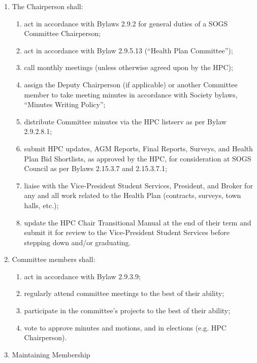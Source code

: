 \begin{enumerate} [label*=\arabic*., align=left]
\begin{enumerate} [label*=\arabic*., align=left]
\begin{enumerate} [label*=\arabic*., align=left]
\item be the primary contact person for Plan Bidders in a tendering year;
\item work with the Accounting Manager, Administrative Assistant, and Communications Administrator to maintain website Health Plan information.
\end{enumerate}
\item The Chairperson shall:
\begin{enumerate} [label*=\arabic*., align=left]	
\item act in accordance with Bylaws 2.9.2 for general duties of a SOGS Committee Chairperson;
\item act in accordance with Bylaw 2.9.5.13 (“Health Plan Committee”);
\item call monthly meetings (unless otherwise agreed upon by the HPC);
\item assign the Deputy Chairperson (if applicable) or another Committee member to take meeting minutes in accordance with Society bylaws, “Minutes Writing Policy”;
\item distribute Committee minutes via the HPC listserv as per Bylaw 2.9.2.8.1;
\item submit HPC updates, AGM Reports, Final Reports, Surveys, and Health Plan Bid Shortlists, as approved by the HPC, for consideration at SOGS Council as per Bylaws 2.15.3.7 and 2.15.3.7.1;
\item liaise with the Vice-President Student Services, President, and Broker for any and all work related to the Health Plan (contracts, surveys, town halls, etc.);
\item update the HPC Chair Transitional Manual at the end of their term and submit it for review to the Vice-President Student Services before stepping down and/or graduating.
\end{enumerate}
\item Committee members shall:
\begin{enumerate}[label*=\arabic*., align=left]
\item act in accordance with Bylaw 2.9.3.9;
\item regularly attend committee meetings to the best of their ability;
\item participate in the committee’s projects to the best of their ability;
\item vote to approve minutes and motions, and in elections (e.g. HPC Chairperson).
\end{enumerate}
\item Maintaining Membership

\end{enumerate}
\end{enumerate}
